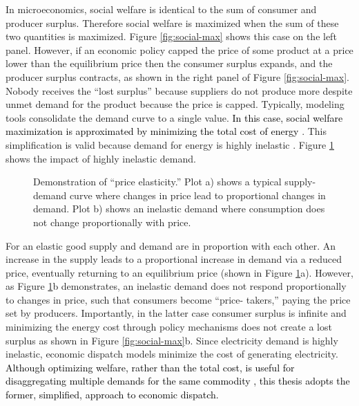 In microeconomics, social welfare is identical to the sum of consumer and
producer surplus. Therefore social welfare is maximized when the sum of these
two quantities is maximized. Figure \ref{fig:social-max} shows this case on the
left panel. However, if an economic policy capped the price of some product at a
price lower than the equilibrium price then the consumer surplus expands, and
the producer surplus contracts, as shown in the right panel of Figure
\ref{fig:social-max}. Nobody receives the ``lost surplus'' because suppliers do
not produce more despite unmet demand for the product because the price is
capped. Typically, modeling tools consolidate the demand curve to a single
value. \textcolor{black}{In this case, social welfare maximization is
approximated by minimizing the total cost of energy
\cite{richstein_cross-border_2014}}. This simplification is valid because demand
for energy is highly inelastic \cite{heuberger_power_2017, eia_price_2021,
labandeira_meta-analysis_2017, csereklyei_price_2020}. Figure
\ref{fig:inelastic} shows the impact of highly inelastic demand.

\begin{figure}[H]
  \centering
  \resizebox{\columnwidth}{!}{}
  \caption{Demonstration of ``price elasticity.'' Plot a) shows a typical supply-demand curve where changes in price lead to proportional changes in demand. Plot b) shows an inelastic demand where consumption does not change proportionally with price.}
  \label{fig:inelastic}
\end{figure}

For an elastic good supply and demand are in proportion with each other. An
increase in the supply leads to a proportional increase in demand via a reduced
price, eventually returning to an equilibrium price (shown in Figure
\ref{fig:inelastic}a). However, as Figure \ref{fig:inelastic}b demonstrates, an
inelastic demand does not respond proportionally to changes in price, such that
consumers become ``price- takers,'' paying the price set by producers.
Importantly, in the latter case consumer surplus is infinite and minimizing the
energy cost through policy mechanisms does not create a lost surplus as shown in
Figure \ref{fig:social-max}b. Since electricity demand is highly inelastic,
economic dispatch models minimize the cost of generating electricity.
\textcolor{black}{Although optimizing welfare, rather than the total cost, is
useful for disaggregating multiple demands for the same commodity
\cite{leuthold_elmod_2008}, this thesis adopts the former, simplified, approach
to economic dispatch.}

